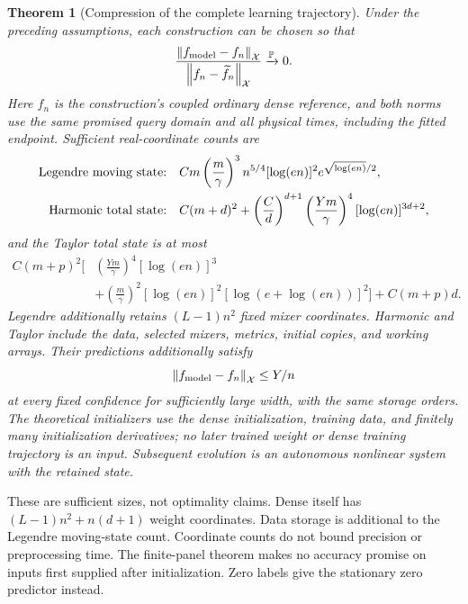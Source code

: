 \documentclass[11pt]{article}
\newtheorem{theorem}{Theorem}[section]
\theoremstyle{definition}
\theoremstyle{remark}
\newcommand{\norm}[1]{\left\lVert#1\right\rVert}
\begin{document}
\begin{theorem}[Compression of the complete learning trajectory]
\label{cp:headline}
Under the preceding assumptions, each construction can be chosen so that
\begin{equation}
 \frac{\norm{f_{\rm model}-f_n}_{\mathcal X}}
      {\norm{f_n-\widetilde f_n}_{\mathcal X}}
       \xrightarrow{\mathbb P}0.
 \label{cp:relative}
\end{equation}
Here $f_n$ is the construction's coupled ordinary dense reference, and both
norms use the same promised query domain and all physical times, including
the fitted endpoint. Sufficient real-coordinate counts are
\begin{align}
 \textnormal{Legendre moving state:}\quad&
 Cm\left(\frac m\gamma\right)^3 n^{5/4}
 [\log(en)]^2e^{\sqrt{\log(en)}/2},
 \label{cp:legendre-size}\\
 \textnormal{Harmonic total state:}\quad&
 C(m+d)^2+\left(\frac Cd\right)^{d+1}
       \left(\frac{Ym}\gamma\right)^4[\log(en)]^{3d+2},
 \label{cp:harmonic-size}
\end{align}
and the Taylor total state is at most
\begin{equation}
 \begin{split}
 C(m+p)^2\bigg[&
       \left(\frac{Ym}\gamma\right)^4[\log(en)]^3
       \\ &+\left(\frac m\gamma\right)^2[\log(en)]^2
                     [\log(e+\log(en))]^2\bigg]
       +C(m+p)d.
 \end{split}
 \label{cp:panel-size}
\end{equation}
Legendre additionally retains $(L-1)n^2$ fixed mixer coordinates.
Harmonic and Taylor include the data, selected mixers, metrics, initial
copies, and working arrays. Their predictions additionally satisfy
\begin{equation}
 \norm{f_{\rm model}-f_n}_{\mathcal X}\le Y/n
 \label{cp:absolute}
\end{equation}
at every fixed confidence for sufficiently large width, with the same
storage orders. The theoretical initializers use the dense initialization,
training data, and finitely many initialization derivatives; no later trained
weight or dense training trajectory is an input. Subsequent evolution is an
autonomous nonlinear system with the retained state.
\end{theorem}

These are sufficient sizes, not optimality claims. Dense itself has
$(L-1)n^2+n(d+1)$ weight coordinates. Data storage is additional to the
Legendre moving-state count. Coordinate counts do not bound precision or
preprocessing time.
The finite-panel theorem makes no accuracy promise on inputs first supplied
after initialization. Zero labels give the stationary zero predictor instead.
\end{document}
